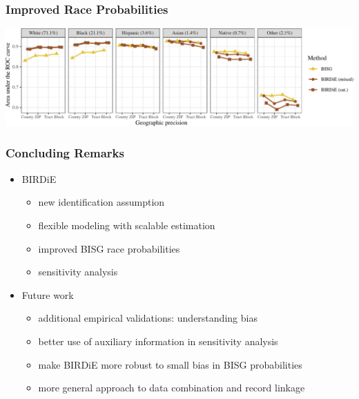 \documentclass{beamer}
\begin{document}
\begin{frame}

  \frametitle{Improved Race Probabilities}

 \includegraphics[width=\textwidth]{../paper/figures/nc_roc.pdf}


\end{frame}

\begin{frame}

  \frametitle{Concluding Remarks}

  \begin{itemize}
  \item BIRDiE
    \begin{itemize}
    \item new identification assumption
    \item flexible modeling with scalable estimation
    \item improved BISG race probabilities
    \item sensitivity analysis
    \end{itemize}
    \vfill

  \item Future work
    \begin{itemize}
    \item additional empirical validations: understanding bias
    \item better use of auxiliary information in sensitivity analysis
    \item make BIRDiE more robust to small bias in BISG probabilities
    \item more general approach to data combination and record linkage
    \end{itemize}
  \end{itemize}


\end{frame}
\end{document}
